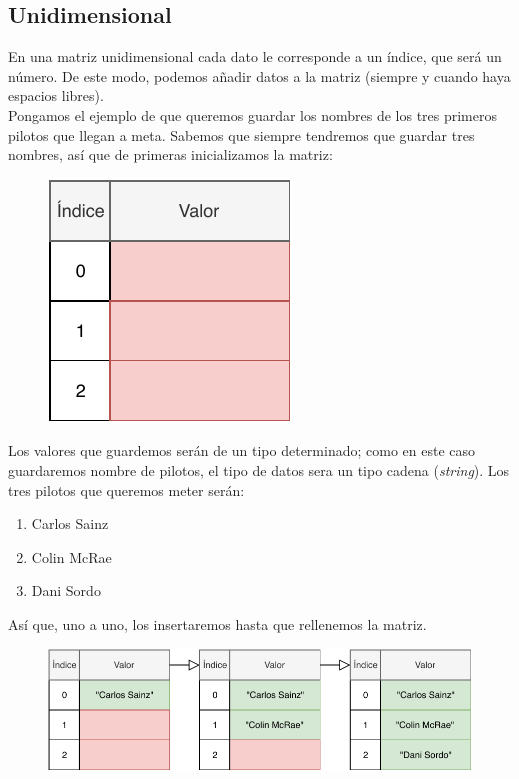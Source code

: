 \documentclass[11pt, oneside]{book}		%
\begin{document}
		\subsection{Unidimensional}
		En una matriz unidimensional\cite{msdn:matrizunidimensional} cada dato le corresponde a un índice, que será un número. De este modo, podemos añadir datos a la matriz (siempre y cuando haya espacios libres).\\
		Pongamos el ejemplo de que queremos guardar los nombres de los tres primeros pilotos que llegan a meta. Sabemos que siempre tendremos que guardar tres nombres, así que de primeras inicializamos la matriz: 
		\begin{figure}[H]
			\centering
			\includegraphics{img/TiposEnumerables/Matriz/array1.pdf}
		\end{figure}
		Los valores que guardemos serán de un tipo determinado; como en este caso guardaremos nombre de pilotos, el tipo de datos sera un tipo cadena (\textit{string}). Los tres pilotos que queremos meter serán:
		\begin{enumerate}
			\item Carlos Sainz
			\item Colin McRae
			\item Dani Sordo
		\end{enumerate}
		Así que, uno a uno, los insertaremos hasta que rellenemos la matriz.
		\begin{figure}[H]
			\centering
			\hspace*{-0.3in}\includegraphics{img/TiposEnumerables/Matriz/array2.pdf}
		\end{figure}
\end{document}
